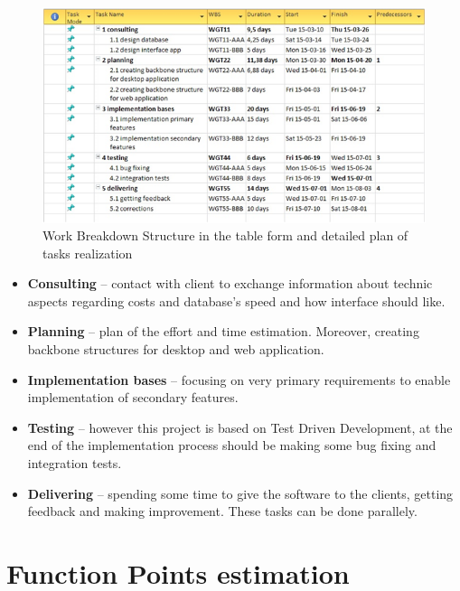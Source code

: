 \documentclass[a4paper,11pt,onecolumn,oneside]{book}
\begin{document}
 \begin{figure}[H]
    \centering
            \includegraphics[width=1\textwidth]{img/WBS.png}
                \caption{Work Breakdown Structure in the table form and detailed plan of tasks realization}
\label{fig:rys1}
\end{figure} 

\begin{itemize}
  \item \textbf{Consulting} – contact with client to exchange information about technic aspects regarding costs and database’s speed and how interface should like.

  \item \textbf{Planning} – plan of the effort and time estimation. Moreover, creating backbone structures for desktop and web application. 

  \item \textbf{Implementation bases} – focusing on very primary requirements to enable implementation of secondary features. 

  \item \textbf{Testing} – however this project is based on Test Driven Development, at the end of the implementation process should be making some bug fixing and integration tests.

  \item \textbf{Delivering} – spending some time to give the software to the clients, getting feedback and making improvement. These tasks can be done parallely. 
\end{itemize}

\section{Function Points estimation}
\end{document}
